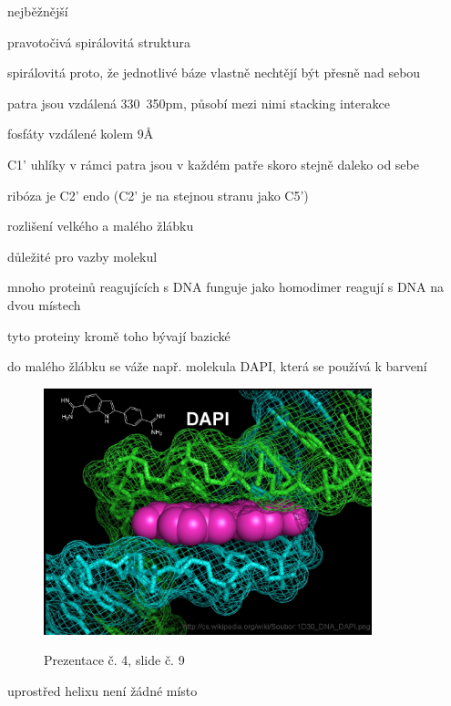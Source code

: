 \documentclass[DIV=8]{scrreprt}
\begin{document}
\begin{myItemize}[nosep]
    \item nejběžnější
    \item pravotočivá spirálovitá struktura
\begin{myItemize}[nosep]
    \item spirálovitá proto, že jednotlivé báze vlastně nechtějí být přesně nad sebou
\end{myItemize}

    \item patra jsou vzdálená 330~350pm, působí mezi nimi stacking interakce
    \item fosfáty vzdálené kolem 9Å
    \item C1' uhlíky v rámci patra jsou v každém patře skoro stejně daleko od sebe
    \item ribóza je C2' endo (C2' je na stejnou stranu jako C5')
    \item rozlišení velkého a malého žlábku
\begin{myItemize}[nosep]
    \item důležité pro vazby molekul
    \item mnoho proteinů reagujících s DNA funguje jako homodimer reagují s DNA na dvou místech
\begin{myItemize}[nosep]
    \item tyto proteiny kromě toho bývají bazické
\end{myItemize}

    \item do malého žlábku se váže např. molekula DAPI, která se používá k barvení \begin{figure}
    \caption{Prezentace č. 4, slide č. 9}
    \includegraphics[width=0.85\textwidth]{slides-4/slide-9.jpg}
    \centering
    \label{slides-4-slide-9}
\end{figure}

\end{myItemize}

    \item uprostřed helixu není žádné místo
\end{myItemize}
\end{document}
